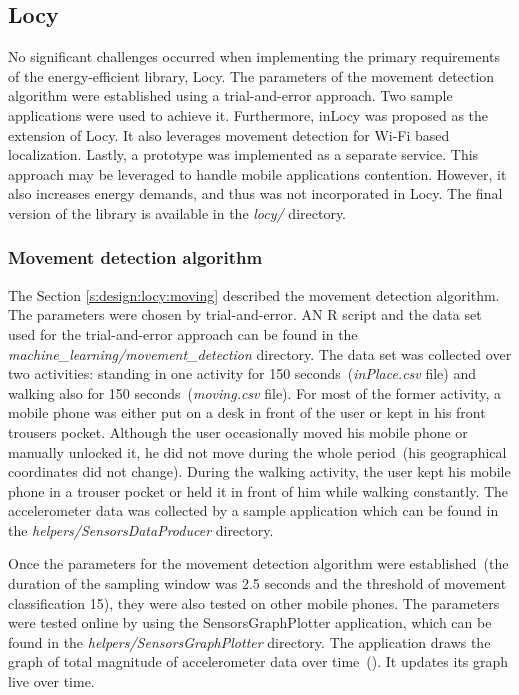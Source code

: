 \subsection{Locy}
No significant challenges occurred when implementing the primary requirements of the energy-efficient library, Locy. The parameters of the movement detection algorithm were established using a trial-and-error approach. Two sample applications were used to achieve it. Furthermore, inLocy was proposed as the extension of Locy. It also leverages movement detection for Wi-Fi based localization. Lastly, a prototype was implemented as a separate service. This approach may be leveraged to handle mobile applications contention. However, it also increases energy demands, and thus was not incorporated in Locy. The final version of the library is available in the \textit{locy/} directory. 

\subsubsection{Movement detection algorithm}
\label{s:implementation:moving}
\hspace{10pt} The Section \ref{s:design:locy:moving} described the movement detection algorithm. The parameters were chosen by trial-and-error. AN R script and the data set used for the trial-and-error approach can be found in the \textit{machine\_learning/movement\_detection} directory. The data set was collected over two activities: standing in one activity for 150 seconds\ (\textit{inPlace.csv} file) and walking also for 150 seconds\ (\textit{moving.csv} file). For most of the former activity, a mobile phone was either put on a desk in front of the user or kept in his front trousers pocket. Although the user occasionally moved his mobile phone or manually unlocked it, he did not move during the whole period\ (his geographical coordinates did not change). During the walking activity, the user kept his mobile phone in a trouser pocket or held it in front of him while walking constantly. The accelerometer data was collected by a sample application which can be found in the \textit{helpers/SensorsDataProducer} directory.

Once the parameters for the movement detection algorithm were established\ (the duration of the sampling window was 2.5 seconds and the threshold of movement classification 15), they were also tested on other mobile phones. The parameters were tested online by using the SensorsGraphPlotter application, which can be found in the \textit{helpers/SensorsGraphPlotter} directory. The application draws the graph of total magnitude of accelerometer data over time\ (). It updates its graph live over time.

